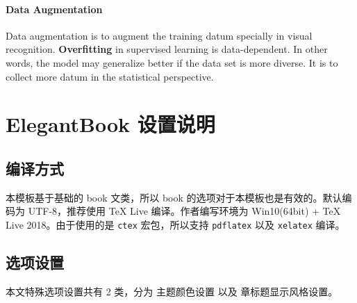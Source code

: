 \documentclass[titlestyle=hang,11pt]{elegantbook}
\begin{document}
\iffalse 
* https://www.zhihu.com/question/24529483
* https://www.jiqizhixin.com/articles/2018-11-10-7
* https://www.jiqizhixin.com/articles/112501
* https://www.jiqizhixin.com/articles/2018-08-27-12
* https://yq.aliyun.com/articles/68901
* https://www.wikiwand.com/en/Regularization_(mathematics)
* [CNN tricks](http://lamda.nju.edu.cn/weixs/project/CNNTricks/CNNTricks.html)
* https://www.jeremyjordan.me/deep-neural-networks-preventing-overfitting/
* https://www.doc.ic.ac.uk/~nd/surprise_96/journal/vol4/cs11/report.html#An%
* https://machinelearningmastery.com/dropout-for-regularizing-deep-neural-networks/
\fi

\subsubsection{Data Augmentation}

Data augmentation is to augment the training datum specially in visual recognition.
\textbf{Overfitting} in supervised learning is data-dependent. In other words, the model may generalize better if the data set is more diverse.
It is to collect more datum in the statistical perspective.




\chapter{ElegantBook 设置说明}


\section{编译方式}

本模板基于基础的 book 文类，所以 book 的选项对于本模板也是有效的。默认编码为 UTF-8，推荐使用 \TeX{} Live 编译。作者编写环境为 Win10(64bit) + \TeX{} Live 2018。由于使用的是 \texttt{ctex} 宏包，所以支持 \texttt{pdflatex} 以及 \texttt{xelatex} 编译。


\section{选项设置}
本文特殊选项设置共有 2 类，分为 {\color{main}主题颜色}设置 以及 {\color{main}章标题显示风格}设置。
\end{document}
